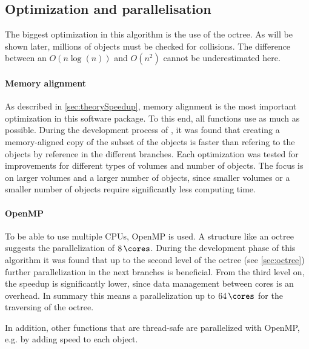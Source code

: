 \subsection{Optimization and parallelisation}\label{sec:modelOpt}
% 
The biggest optimization in this algorithm is the use of the octree.
As will be shown later, millions of objects must be checked for collisions.
The difference between an $O(n\log(n))$ and $O(n^2)$ cannot be underestimated here.
% 
%
\paragraph{Memory alignment}
As described in \cref{sec:theorySpeedup}, memory alignment is the most important optimization in this software package.
To this end, all functions use  as much as possible.
During the development process of , it was found that creating a memory-aligned copy of the subset of the objects is faster than refering to the objects by reference in the different branches.
Each optimization was tested for improvements for different types of volumes and number of objects.
The focus is on larger volumes and a larger number of objects, since smaller volumes or a smaller number of objects require significantly less computing time.
%
%
\paragraph{OpenMP}
To be able to use multiple \acp{CPU}, \ac{OpenMP} is used.
A structure like an octree suggests the parallelization of $\SI{8}{\cores}$.
During the development phase of this algorithm it was found that up to the second level of the octree (see \cref{sec:octree}) further parallelization in the next branches is beneficial.
From the third level on, the speedup is significantly lower, since data management between cores is an overhead.
In summary this means a parallelization up to $\SI{64}{\cores}$ for the traversing of the octree.
\par
% 
In addition, other functions that are thread-safe are parallelized with \ac{OpenMP}, e.g. by adding speed to each object.
%
%
%

